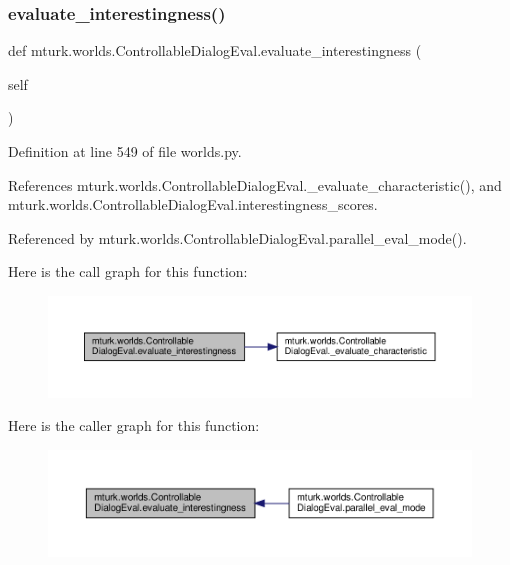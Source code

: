 \subsubsection{\texorpdfstring{evaluate\+\_\+interestingness()}{evaluate\_interestingness()}}
{\footnotesize\ttfamily def mturk.\+worlds.\+Controllable\+Dialog\+Eval.\+evaluate\+\_\+interestingness (\begin{DoxyParamCaption}\item[{}]{self }\end{DoxyParamCaption})}



Definition at line 549 of file worlds.\+py.



References mturk.\+worlds.\+Controllable\+Dialog\+Eval.\+\_\+evaluate\+\_\+characteristic(), and mturk.\+worlds.\+Controllable\+Dialog\+Eval.\+interestingness\+\_\+scores.



Referenced by mturk.\+worlds.\+Controllable\+Dialog\+Eval.\+parallel\+\_\+eval\+\_\+mode().

Here is the call graph for this function\+:
\nopagebreak
\begin{figure}[H]
\begin{center}
\leavevmode
\includegraphics[width=350pt]{classmturk_1_1worlds_1_1ControllableDialogEval_ab625c0747ada739776242995de66f5e9_cgraph}
\end{center}
\end{figure}
Here is the caller graph for this function\+:
\nopagebreak
\begin{figure}[H]
\begin{center}
\leavevmode
\includegraphics[width=350pt]{classmturk_1_1worlds_1_1ControllableDialogEval_ab625c0747ada739776242995de66f5e9_icgraph}
\end{center}
\end{figure}
\mbox{\label{classmturk_1_1worlds_1_1ControllableDialogEval_a7002b931f1813d4757dc00e67293aa90}} 
